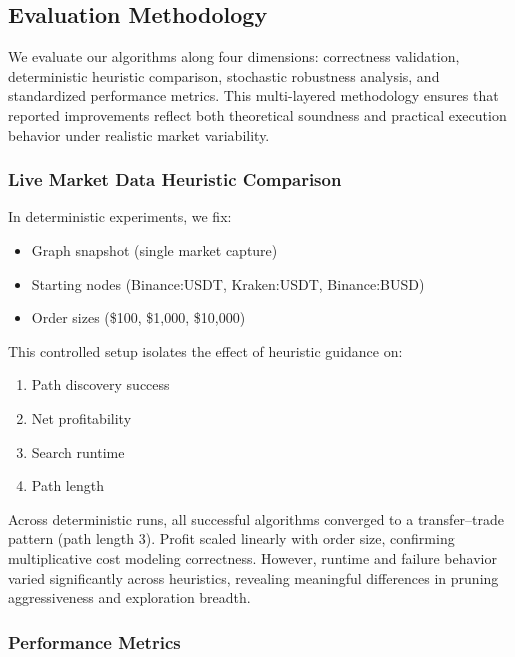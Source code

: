 \subsection{Evaluation Methodology}
\label{sec:evaluation}

We evaluate our algorithms along four dimensions: correctness validation,
deterministic heuristic comparison, stochastic robustness analysis, and
standardized performance metrics. This multi-layered methodology ensures that
reported improvements reflect both theoretical soundness and practical
execution behavior under realistic market variability.

\subsubsection{Live Market Data Heuristic Comparison}

In deterministic experiments, we fix:
\begin{itemize}
    \item Graph snapshot (single market capture)
    \item Starting nodes (Binance:USDT, Kraken:USDT, Binance:BUSD)
    \item Order sizes (\$100, \$1{,}000, \$10{,}000)
\end{itemize}

This controlled setup isolates the effect of heuristic guidance on:
\begin{enumerate}
    \item Path discovery success
    \item Net profitability
    \item Search runtime
    \item Path length
\end{enumerate}

Across deterministic runs, all successful algorithms converged to a
transfer–trade pattern (path length 3). Profit scaled linearly with order size,
confirming multiplicative cost modeling correctness. However, runtime and
failure behavior varied significantly across heuristics, revealing meaningful
differences in pruning aggressiveness and exploration breadth.

\subsubsection{Performance Metrics}

